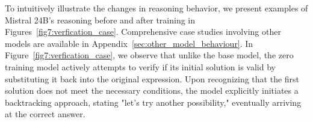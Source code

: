 
To intuitively illustrate the changes in reasoning behavior, we present examples of Mistral 24B's reasoning before and after training in Figures~\ref{fig7:verfication_case}. Comprehensive case studies involving other models are available in Appendix~\ref{sec:other_model_behaviour}. In Figure~\ref{fig7:verfication_case}, we observe that unlike the base model, the zero training model actively attempts to verify if its initial solution is valid by substituting it back into the original expression. Upon recognizing that the first solution does not meet the necessary conditions, the model explicitly initiates a backtracking approach, stating "let's try another possibility," eventually arriving at the correct answer. 






